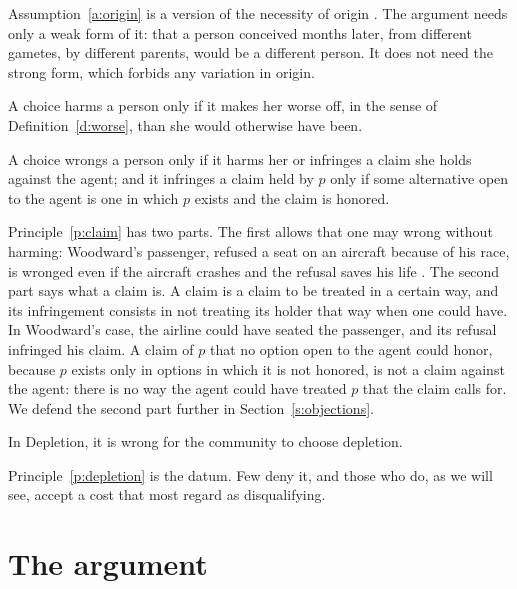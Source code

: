 \documentclass{situationist-preprint}
\begin{document}
Assumption~\ref{a:origin} is a version of the necessity of origin \citep[lecture III]{Kripke1980}. The argument needs only a weak form of it: that a person conceived months later, from different gametes, by different parents, would be a different person. It does not need the strong form, which forbids any variation in origin.

\begin{principle}\label{p:harm}
A choice harms a person only if it makes her worse off, in the sense of Definition~\ref{d:worse}, than she would otherwise have been.
\end{principle}

\begin{principle}\label{p:claim}
A choice wrongs a person only if it harms her or infringes a claim she holds against the agent; and it infringes a claim held by $p$ only if some alternative open to the agent is one in which $p$ exists and the claim is honored.
\end{principle}

Principle~\ref{p:claim} has two parts. The first allows that one may wrong without harming: Woodward's passenger, refused a seat on an aircraft because of his race, is wronged even if the aircraft crashes and the refusal saves his life \citep{Woodward1986}. The second part says what a claim is. A claim is a claim to be treated in a certain way, and its infringement consists in not treating its holder that way when one could have. In Woodward's case, the airline could have seated the passenger, and its refusal infringed his claim. A claim of $p$ that no option open to the agent could honor, because $p$ exists only in options in which it is not honored, is not a claim against the agent: there is no way the agent could have treated $p$ that the claim calls for. We defend the second part further in Section~\ref{s:objections}.

\begin{principle}[Depletion]\label{p:depletion}
In Depletion, it is wrong for the community to choose depletion.
\end{principle}

Principle~\ref{p:depletion} is the datum. Few deny it, and those who do, as we will see, accept a cost that most regard as disqualifying.

\section{The argument}\label{s:argument}
\end{document}
